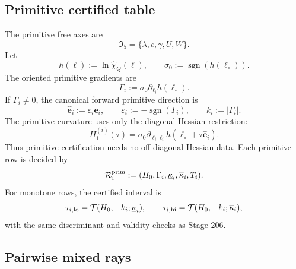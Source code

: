 \subsection{Primitive certified table}
\label{subsec:part06-primitive-certified-table}

The primitive free axes are
\begin{equation}
\label{eq:part06-primitive-axes}
\mathfrak I_5=\{\lambda,c,\gamma,U,W\}.
\end{equation}
Let
\begin{equation}
\label{eq:part06-h-log-def}
h(\boldsymbol\ell):=\ln\widehat\chi_Q(\boldsymbol\ell),
\qquad
\sigma_0:=\operatorname{sgn}(h(\boldsymbol\ell_\circ)).
\end{equation}
The oriented primitive gradients are
\begin{equation}
\label{eq:part06-Gamma-i}
\Gamma_i:=\sigma_0\partial_{\ell_i}h(\boldsymbol\ell_\circ).
\end{equation}
If \(\Gamma_i\neq0\), the canonical forward primitive direction is
\begin{equation}
\label{eq:part06-primitive-orientation}
\widehat{\mathbf e}_i:=\varepsilon_i\mathbf e_i,
\qquad
\varepsilon_i:=-\operatorname{sgn}(\Gamma_i),
\qquad
k_i:=|\Gamma_i|.
\end{equation}
The primitive curvature uses only the diagonal Hessian restriction:
\begin{equation}
\label{eq:part06-primitive-diagonal-Hessian}
H_1^{(i)}(\tau)
=
\sigma_0\partial_{\ell_i\ell_i}h(\boldsymbol\ell_\circ+\tau\widehat{\mathbf e}_i).
\end{equation}
Thus primitive certification needs no off-diagonal Hessian data.  Each primitive row is decided by
\begin{equation}
\label{eq:part06-primitive-row-data}
\mathcal R_i^{\rm prim}:=(H_0,\Gamma_i,\underline\kappa_i,\overline\kappa_i,T_i).
\end{equation}
For monotone rows, the certified interval is
\begin{equation}
\label{eq:part06-primitive-interval}
\tau_{i,\rm lo}=\mathcal T(H_0,-k_i;\underline\kappa_i),
\qquad
\tau_{i,\rm hi}=\mathcal T(H_0,-k_i;\overline\kappa_i),
\end{equation}
with the same discriminant and validity checks as Stage 206.

\subsection{Pairwise mixed rays}
\label{subsec:part06-pairwise-mixed-rays}

